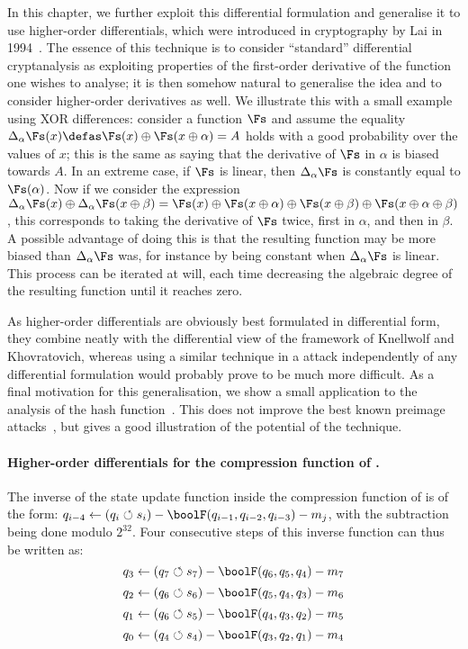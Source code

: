 In this chapter, we further exploit this differential formulation and generalise it to use higher-order
differentials, which were introduced in cryptography by Lai in 1994~\cite{L94}. The essence
of this technique is to consider ``standard'' differential cryptanalysis as exploiting properties
of the first-order derivative of the function one wishes to analyse; it is then somehow natural
to generalise the idea and to consider higher-order derivatives as well. We illustrate this
with a small example using XOR differences: consider a function $\Fs$ and
assume the equality $\Delta_\alpha\Fs(x) \defas \Fs(x) \oplus \Fs(x \oplus \alpha) = A$ holds with a good probability
over the values of $x$; this
is the same as saying that the derivative of $\Fs$ in $\alpha$ is biased towards $A$. In an extreme case,
if $\Fs$ is linear, then $\Delta_\alpha\Fs$ is constantly equal to $\Fs(\alpha)$.
Now if we consider the expression $\Delta_\alpha\Fs(x) \oplus \Delta_\alpha\Fs(x \oplus \beta) =
\Fs(x) \oplus \Fs(x \oplus \alpha) \oplus \Fs(x \oplus \beta)
\oplus \Fs(x \oplus \alpha \oplus \beta)$, this corresponds to taking the derivative of $\Fs$ twice,
first
in $\alpha$, and then in $\beta$. A possible advantage of doing this is that the resulting function may be more
biased than $\Delta_\alpha\Fs$ was, for instance by being constant when $\Delta_\alpha\Fs$ is linear.
This process can be iterated at will, each time decreasing the algebraic degree of the resulting
function until it reaches zero.

As higher-order differentials are obviously best formulated in differential form,
they combine neatly with the differential view of the framework of Knellwolf and Khovratovich, whereas
using a similar technique in a \mitm attack independently of any differential formulation would probably prove to be
much more difficult.
As a final motivation for this generalisation, we show a small application to
the analysis of the \mdfour hash function~\cite{Rivest-md4}. This does not improve the best known
preimage attacks~\cite{md4p2,md4p3}, but gives a good illustration of the potential of the technique.

\paragraph{Higher-order differentials for the compression function of \mdfour.}

The inverse of the state update function inside the compression function of \mdfour is of
the form: $q_{i-4} \leftarrow (q_i \circlearrowleft s_i) - \boolF(q_{i-1}, q_{i-2}, q_{i-3}) - m_j$,
with
the subtraction being done modulo $2^{32}$.
Four consecutive steps of this inverse function can thus be written as:
\[
q_3 \leftarrow (q_7 \circlearrowleft s_7) - \boolF(q_6, q_5, q_4) - m_7
\]
\[
q_2 \leftarrow (q_6 \circlearrowleft s_6) - \boolF(q_5, q_4, q_3) - m_6
\]
\[
q_1 \leftarrow (q_6 \circlearrowleft s_5) - \boolF(q_4, q_3, q_2) - m_5
\]
\[
q_0 \leftarrow (q_4 \circlearrowleft s_4) - \boolF(q_3, q_2, q_1) - m_4
\]

